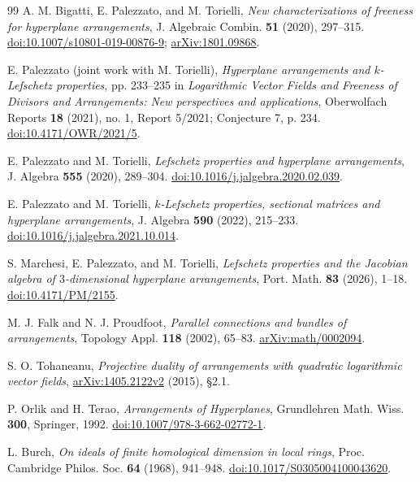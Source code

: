 \documentclass[11pt]{article}
\begin{document}
\begin{thebibliography}{99}\small
{}
A. M. Bigatti, E. Palezzato, and M. Torielli,
\emph{New characterizations of freeness for hyperplane arrangements},
J. Algebraic Combin. \textbf{51} (2020), 297--315.
\href{https://doi.org/10.1007/s10801-019-00876-9}{doi:10.1007/s10801-019-00876-9};
\href{https://arxiv.org/abs/1801.09868}{arXiv:1801.09868}.

E. Palezzato (joint work with M. Torielli),
\emph{Hyperplane arrangements and $k$-Lefschetz properties}, pp. 233--235
in \emph{Logarithmic Vector Fields and Freeness of Divisors and Arrangements:
New perspectives and applications}, Oberwolfach Reports \textbf{18}
(2021), no. 1, Report 5/2021; Conjecture 7, p. 234.
\href{https://doi.org/10.4171/OWR/2021/5}{doi:10.4171/OWR/2021/5}.

E. Palezzato and M. Torielli,
\emph{Lefschetz properties and hyperplane arrangements},
J. Algebra \textbf{555} (2020), 289--304.
\href{https://doi.org/10.1016/j.jalgebra.2020.02.039}{doi:10.1016/j.jalgebra.2020.02.039}.

E. Palezzato and M. Torielli,
\emph{$k$-Lefschetz properties, sectional matrices and hyperplane arrangements},
J. Algebra \textbf{590} (2022), 215--233.
\href{https://doi.org/10.1016/j.jalgebra.2021.10.014}{doi:10.1016/j.jalgebra.2021.10.014}.

S. Marchesi, E. Palezzato, and M. Torielli,
\emph{Lefschetz properties and the Jacobian algebra of $3$-dimensional
hyperplane arrangements}, Port. Math. \textbf{83} (2026), 1--18.
\href{https://doi.org/10.4171/PM/2155}{doi:10.4171/PM/2155}.

M. J. Falk and N. J. Proudfoot,
\emph{Parallel connections and bundles of arrangements},
Topology Appl. \textbf{118} (2002), 65--83.
\href{https://arxiv.org/abs/math/0002094}{arXiv:math/0002094}.

S. O. Tohaneanu,
\emph{Projective duality of arrangements with quadratic logarithmic vector fields},
\href{https://arxiv.org/abs/1405.2122v2}{arXiv:1405.2122v2} (2015), \S2.1.

P. Orlik and H. Terao, \emph{Arrangements of Hyperplanes},
Grundlehren Math. Wiss. \textbf{300}, Springer, 1992.
\href{https://doi.org/10.1007/978-3-662-02772-1}{doi:10.1007/978-3-662-02772-1}.

L. Burch, \emph{On ideals of finite homological dimension in local rings},
Proc. Cambridge Philos. Soc. \textbf{64} (1968), 941--948.
\href{https://doi.org/10.1017/S0305004100043620}{doi:10.1017/S0305004100043620}.


\end{thebibliography}
\end{document}
